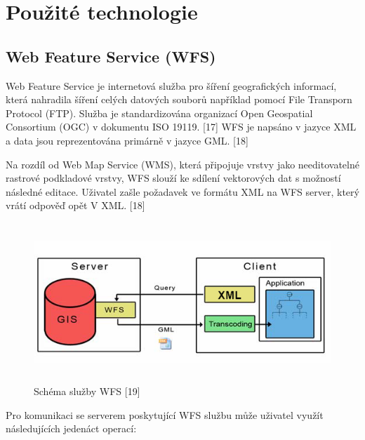 \documentclass[a4paper,oneside,12pt]{book}
\begin{document}
\newpage
\newpage

\chapter{Použité technologie} \label{tehcnologie}

\section{Web Feature Service (WFS)} \label{wfs}
Web Feature Service je internetová služba pro šíření geografických informací, která nahradila šíření celých datových souborů například pomocí File Transporn Protocol (FTP). Služba je standardizována organizací Open Geospatial Consortium (OGC) v dokumentu  ISO 19119. [17] WFS je napsáno v jazyce XML a data jsou reprezentována primárně v jazyce GML. [18]

Na rozdíl od Web Map Service (WMS), která připojuje vrstvy jako needitovatelné rastrové podkladové vrstvy, WFS slouží ke sdílení vektorových dat s možností následné editace. Uživatel zašle požadavek ve formátu XML na WFS server, který vrátí odpověď opět V XML. [18]

\begin{figure}[ht] \label{obr5}
\centering
\includegraphics[height=6cm]{pictures/XML.png}
\caption{Schéma služby WFS [19]}
\label{fig:xml}
\end{figure}

Pro komunikaci se serverem poskytující WFS službu může uživatel využít následujících jedenáct operací:
\end{document}
